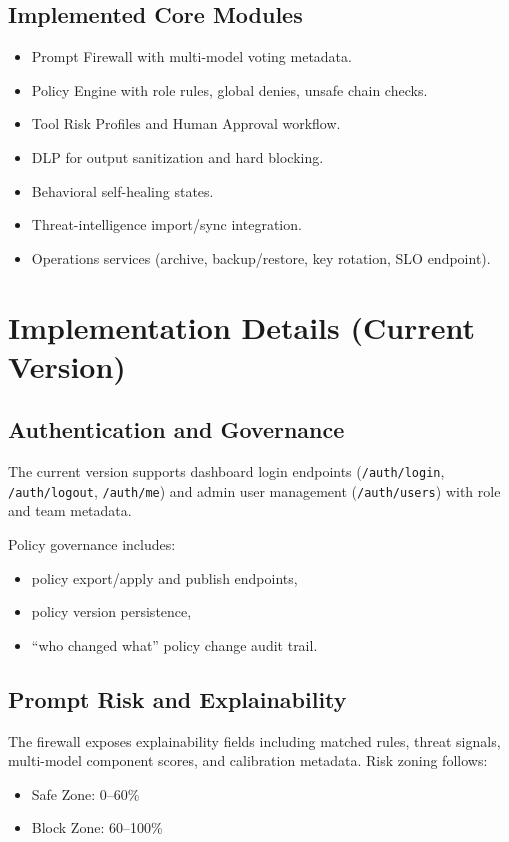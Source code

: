 \documentclass[conference]{IEEEtran}
\begin{document}
\subsection{Implemented Core Modules}
\begin{itemize}
    \item Prompt Firewall with multi-model voting metadata.
    \item Policy Engine with role rules, global denies, unsafe chain checks.
    \item Tool Risk Profiles and Human Approval workflow.
    \item DLP for output sanitization and hard blocking.
    \item Behavioral self-healing states.
    \item Threat-intelligence import/sync integration.
    \item Operations services (archive, backup/restore, key rotation, SLO endpoint).
\end{itemize}

\section{Implementation Details (Current Version)}
\subsection{Authentication and Governance}
The current version supports dashboard login endpoints (\texttt{/auth/login}, \texttt{/auth/logout}, \texttt{/auth/me}) and admin user management (\texttt{/auth/users}) with role and team metadata.

Policy governance includes:
\begin{itemize}
    \item policy export/apply and publish endpoints,
    \item policy version persistence,
    \item ``who changed what'' policy change audit trail.
\end{itemize}

\subsection{Prompt Risk and Explainability}
The firewall exposes explainability fields including matched rules, threat signals, multi-model component scores, and calibration metadata. Risk zoning follows:
\begin{itemize}
    \item Safe Zone: 0--60\%
    \item Block Zone: 60--100\%
\end{itemize}
\end{document}
